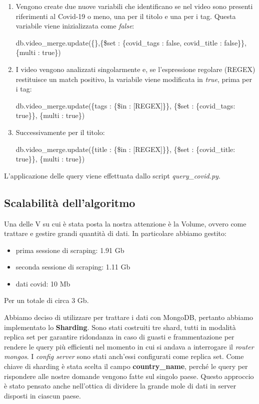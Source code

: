 \documentclass[10pt, a4paper,openany]{article}
\begin{document}
	\begin{enumerate}
		\item Vengono create due nuove variabili che identificano se nel video sono presenti riferimenti al Covid-19 o meno, una per il titolo e una per i tag. Questa variabile viene inizializzata come \textit{false}:
		
			db.video\_merge.update(\{\},\{\$set : \{covid\_tags : false, covid\_title : false\}\},\{multi : true\})
		
		\item I video vengono analizzati singolarmente e, se l'espressione regolare (REGEX) restituisce un match positivo, la variabile viene modificata in \textit{true}, prima per i tag:
		
			db.video\_merge.update(\{tags : \{\$in : [REGEX]\}\}, \{\$set : \{covid\_tags: true\}\}, \{multi : true\})
		
		\item Successivamente per il titolo:
		
			db.video\_merge.update(\{title : \{\$in : [REGEX]\}\}, \{\$set : \{covid\_title: true\}\}, \{multi : true\})
	\end{enumerate}
	L'applicazione delle query viene effettuata dallo script \textit{query\_covid.py}.
	
\subsection*{Scalabilità dell'algoritmo}

Una delle V su cui è stata posta la nostra attenzione è la Volume, ovvero come trattare e gestire grandi quantità di dati. 
In particolare abbiamo gestito:
\begin{itemize}
	\item prima sessione di scraping: 1.91 Gb
	\item seconda sessione di scraping: 1.11 Gb
	\item dati covid: 10 Mb
\end{itemize}
Per un totale di circa 3 Gb.

Abbiamo deciso di utilizzare per trattare i dati con MongoDB, pertanto abbiamo implementato lo \textbf{Sharding}.
Sono stati costruiti tre shard, tutti in modalità replica set per garantire ridondanza in caso di guasti e frammentazione per rendere le query più efficienti nel momento in cui si andava a interrogare il \textit{router mongos}. I \textit{config server} sono stati anch'essi configurati come replica set. Come chiave di sharding è stata scelta il campo \textbf{country\_name}, perché le query per rispondere alle nostre domande vengono fatte sul singolo paese. Questo approccio è stato pensato anche nell'ottica di dividere la grande mole di dati in server disposti in ciascun paese. 
\end{document}
